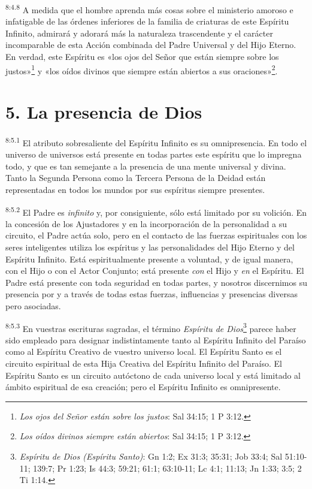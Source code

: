 \par
\textsuperscript{8:4.8} A medida que el hombre aprenda más cosas sobre el ministerio amoroso e infatigable de las órdenes inferiores de la familia de criaturas de este Espíritu Infinito, admirará y adorará más la naturaleza trascendente y el carácter incomparable de esta Acción combinada del Padre Universal y del Hijo Eterno. En verdad, este Espíritu es «los ojos del Señor que están siempre sobre los justos»\footnote{\textit{Los ojos del Señor están sobre los justos}: Sal 34:15; 1 P 3:12.} y «los oídos divinos que siempre están abiertos a sus oraciones»\footnote{\textit{Los oídos divinos siempre están abiertos}: Sal 34:15; 1 P 3:12.}.

\section*{5. La presencia de Dios}
\par
\textsuperscript{8:5.1} El atributo sobresaliente del Espíritu Infinito es su omnipresencia. En todo el universo de universos está presente en todas partes este espíritu que lo impregna todo, y que es tan semejante a la presencia de una mente universal y divina. Tanto la Segunda Persona como la Tercera Persona de la Deidad están representadas en todos los mundos por sus espíritus siempre presentes.

\par
\textsuperscript{8:5.2} El Padre es \textit{infinito} y, por consiguiente, sólo está limitado por su volición. En la concesión de los Ajustadores y en la incorporación de la personalidad a su circuito, el Padre actúa solo, pero en el contacto de las fuerzas espirituales con los seres inteligentes utiliza los espíritus y las personalidades del Hijo Eterno y del Espíritu Infinito. Está espiritualmente presente a voluntad, y de igual manera, con el Hijo o con el Actor Conjunto; está presente \textit{con} el Hijo y \textit{en} el Espíritu. El Padre está presente con toda seguridad en todas partes, y nosotros discernimos su presencia por y a través de todas estas fuerzas, influencias y presencias diversas pero asociadas.

\par
\textsuperscript{8:5.3} En vuestras escrituras sagradas, el término \textit{Espíritu de Dios}\footnote{\textit{Espíritu de Dios (Espíritu Santo)}: Gn 1:2; Ex 31:3; 35:31; Job 33:4; Sal 51:10-11; 139:7; Pr 1:23; Is 44:3; 59:21; 61:1; 63:10-11; Lc 4:1; 11:13; Jn 1:33; 3:5; 2 Ti 1:14.} parece haber sido empleado para designar indistintamente tanto al Espíritu Infinito del Paraíso como al Espíritu Creativo de vuestro universo local. El Espíritu Santo es el circuito espiritual de esta Hija Creativa del Espíritu Infinito del Paraíso. El Espíritu Santo es un circuito autóctono de cada universo local y está limitado al ámbito espiritual de esa creación; pero el Espíritu Infinito es omnipresente.

